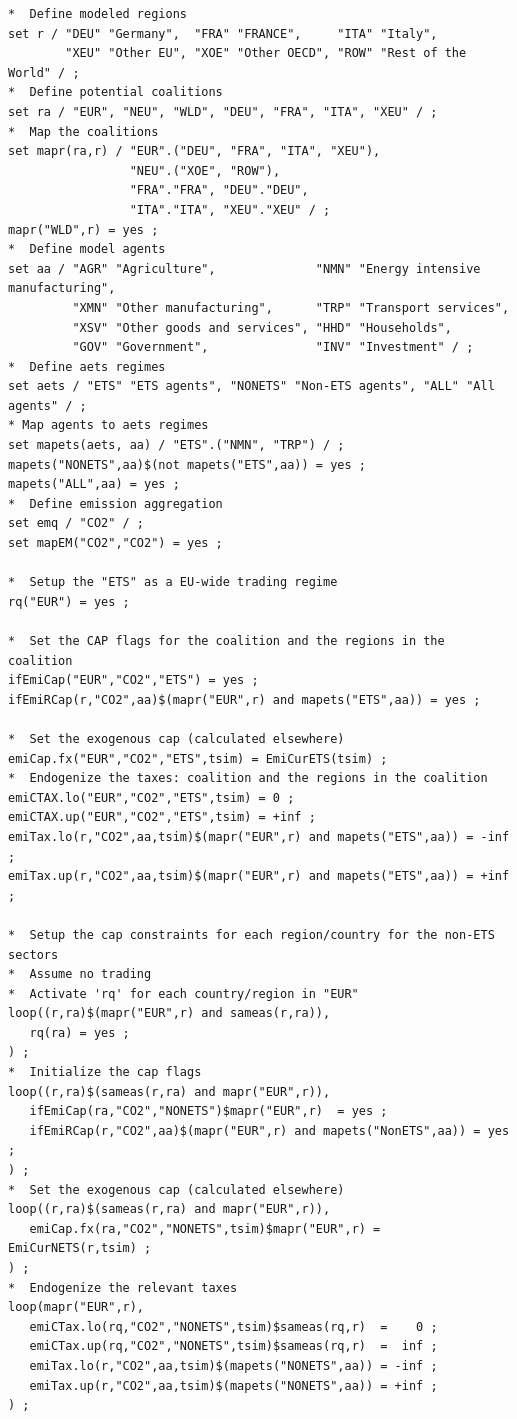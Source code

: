 \documentclass[11pt,letterpaper]{report}
\begin{document}
\begin{lstlisting}[language=GAMS, caption={Example of ETS regime}]
*  Define modeled regions
set r / "DEU" "Germany",  "FRA" "FRANCE",     "ITA" "Italy",
        "XEU" "Other EU", "XOE" "Other OECD", "ROW" "Rest of the World" / ;
*  Define potential coalitions
set ra / "EUR", "NEU", "WLD", "DEU", "FRA", "ITA", "XEU" / ;
*  Map the coalitions
set mapr(ra,r) / "EUR".("DEU", "FRA", "ITA", "XEU"),
                 "NEU".("XOE", "ROW"),
                 "FRA"."FRA", "DEU"."DEU",
                 "ITA"."ITA", "XEU"."XEU" / ;
mapr("WLD",r) = yes ;
*  Define model agents
set aa / "AGR" "Agriculture",              "NMN" "Energy intensive manufacturing",
         "XMN" "Other manufacturing",      "TRP" "Transport services",
         "XSV" "Other goods and services", "HHD" "Households",
         "GOV" "Government",               "INV" "Investment" / ;
*  Define aets regimes
set aets / "ETS" "ETS agents", "NONETS" "Non-ETS agents", "ALL" "All agents" / ;
* Map agents to aets regimes
set mapets(aets, aa) / "ETS".("NMN", "TRP") / ;
mapets("NONETS",aa)$(not mapets("ETS",aa)) = yes ;
mapets("ALL",aa) = yes ;
*  Define emission aggregation
set emq / "CO2" / ;
set mapEM("CO2","CO2") = yes ;

*  Setup the "ETS" as a EU-wide trading regime
rq("EUR") = yes ;

*  Set the CAP flags for the coalition and the regions in the coalition
ifEmiCap("EUR","CO2","ETS") = yes ;
ifEmiRCap(r,"CO2",aa)$(mapr("EUR",r) and mapets("ETS",aa)) = yes ;

*  Set the exogenous cap (calculated elsewhere)
emiCap.fx("EUR","CO2","ETS",tsim) = EmiCurETS(tsim) ;
*  Endogenize the taxes: coalition and the regions in the coalition
emiCTAX.lo("EUR","CO2","ETS",tsim) = 0 ;
emiCTAX.up("EUR","CO2","ETS",tsim) = +inf ;
emiTax.lo(r,"CO2",aa,tsim)$(mapr("EUR",r) and mapets("ETS",aa)) = -inf ;
emiTax.up(r,"CO2",aa,tsim)$(mapr("EUR",r) and mapets("ETS",aa)) = +inf ;

*  Setup the cap constraints for each region/country for the non-ETS sectors
*  Assume no trading
*  Activate 'rq' for each country/region in "EUR"
loop((r,ra)$(mapr("EUR",r) and sameas(r,ra)),
   rq(ra) = yes ;
) ;
*  Initialize the cap flags
loop((r,ra)$(sameas(r,ra) and mapr("EUR",r)),
   ifEmiCap(ra,"CO2","NONETS")$mapr("EUR",r)  = yes ;
   ifEmiRCap(r,"CO2",aa)$(mapr("EUR",r) and mapets("NonETS",aa)) = yes ;
) ;
*  Set the exogenous cap (calculated elsewhere)
loop((r,ra)$(sameas(r,ra) and mapr("EUR",r)),
   emiCap.fx(ra,"CO2","NONETS",tsim)$mapr("EUR",r) = EmiCurNETS(r,tsim) ;
) ;
*  Endogenize the relevant taxes
loop(mapr("EUR",r),
   emiCTax.lo(rq,"CO2","NONETS",tsim)$sameas(rq,r)  =    0 ;
   emiCTax.up(rq,"CO2","NONETS",tsim)$sameas(rq,r)  =  inf ;
   emiTax.lo(r,"CO2",aa,tsim)$(mapets("NONETS",aa)) = -inf ;
   emiTax.up(r,"CO2",aa,tsim)$(mapets("NONETS",aa)) = +inf ;
) ;
\end{lstlisting}
\end{document}

